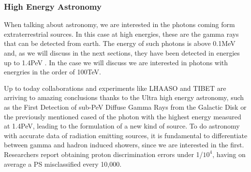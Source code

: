 \documentclass{article}
\begin{document}
\subsubsection{High Energy Astronomy}
When talking about astronomy, we are interested in the photons coming form extraterrestrial sources. In this case at high energies,  these are the gamma rays that can be detected from earth. The energy of such photons is above 0.1MeV and, as we will discuss in the next sections, they have been detected in energies up to 1.4PeV \cite{UHEgammapaper}. In the case we will discuss we are interested in photons with energries in the order of 100TeV.

Up to today collaborations and experiments like LHAASO and TIBET are arriving to amazing conclusions thanks to the Ultra high energy astronomy, such as the First Detection of sub-PeV Diffuse Gamma Rays from the Galactic Disk \cite{TIBETpaper} or the previously mentioned cased of the photon with the highest energy measured at 1.4PeV, leading to the formulation of a new kind of source. To do astronomy with accurate data of radiation emitting sources, it is fundamental to differentiate between gamma and hadron induced showers, since we are interested in the first. Researchers report obtaining proton discrimination errors under 1/$10^4$, having on average a PS misclassified every 10,000. 
\end{document}
